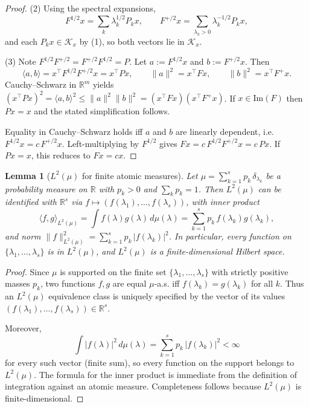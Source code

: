 \documentclass{article}
\theoremstyle{plain}
\newtheorem{lemma}{Lemma}[section]
\numberwithin{equation}{section}
\theoremstyle{definition}
\theoremstyle{remark}
\begin{document}
\begin{lemmaproofbox}
\begin{proof}
(2) Using the spectral expansions,
\[
F^{1/2}x=\sum_k \lambda_k^{1/2}P_kx,\qquad
F^{+/2}x=\sum_{\lambda_k>0}\lambda_k^{-1/2}P_kx,
\]
and each $P_kx\in\mathcal{K}_x$ by (1), so both vectors lie in $\mathcal{K}_x$.

(3) Note $F^{1/2}F^{+/2}=F^{+/2}F^{1/2}=P$. Let $a:=F^{1/2}x$ and $b:=F^{+/2}x$. Then
\[
\langle a,b\rangle = x^\top F^{1/2}F^{+/2}x = x^\top Px,\qquad
\|a\|^2=x^\top Fx,\qquad
\|b\|^2=x^\top F^+x.
\]
Cauchy--Schwarz in $\mathbb{R}^m$ yields $(x^\top Px)^2=\langle a,b\rangle^2\le \|a\|^2\|b\|^2=(x^\top Fx)(x^\top F^+x)$.
If $x\in\mathrm{Im}(F)$ then $Px=x$ and the stated simplification follows.

Equality in Cauchy--Schwarz holds iff $a$ and $b$ are linearly dependent, i.e. $F^{1/2}x=c\,F^{+/2}x$. Left-multiplying
by $F^{1/2}$ gives $Fx=c\,F^{1/2}F^{+/2}x=c\,Px$. If $Px=x$, this reduces to $Fx=cx$.
\end{proof}
\end{lemmaproofbox}
\begin{lemmaproofbox}
\begin{lemma}[$L^2(\mu)$ for finite atomic measures]
\label{lemma:l2_atomic}
Let $\mu=\sum_{k=1}^s p_k\,\delta_{\lambda_k}$ be a probability measure on $\mathbb{R}$ with $p_k>0$ and $\sum_k p_k=1$.
Then $L^2(\mu)$ can be identified with $\mathbb{R}^s$ via $f\mapsto (f(\lambda_1),\dots,f(\lambda_s))$, with inner product
\[
\langle f,g\rangle_{L^2(\mu)}=\int f(\lambda)g(\lambda)\,d\mu(\lambda)=\sum_{k=1}^s p_k\,f(\lambda_k)g(\lambda_k),
\]
and norm $\|f\|_{L^2(\mu)}^2=\sum_{k=1}^s p_k\,|f(\lambda_k)|^2$. In particular, every function on
$\{\lambda_1,\dots,\lambda_s\}$ is in $L^2(\mu)$, and $L^2(\mu)$ is a finite-dimensional Hilbert space.
\end{lemma}

\begin{proof}
Since $\mu$ is supported on the finite set $\{\lambda_1,\dots,\lambda_s\}$ with strictly positive masses $p_k$, two functions
$f,g$ are equal $\mu$-a.s. iff $f(\lambda_k)=g(\lambda_k)$ for all $k$. Thus an $L^2(\mu)$ equivalence class is uniquely
specified by the vector of its values $(f(\lambda_1),\dots,f(\lambda_s))\in\mathbb{R}^s$.

Moreover,
\[
\int |f(\lambda)|^2\,d\mu(\lambda)=\sum_{k=1}^s p_k\,|f(\lambda_k)|^2 < \infty
\]
for every such vector (finite sum), so every function on the support belongs to $L^2(\mu)$. The formula for the inner product
is immediate from the definition of integration against an atomic measure. Completeness follows because $L^2(\mu)$ is
finite-dimensional.
\end{proof}
\end{lemmaproofbox}
\end{document}

